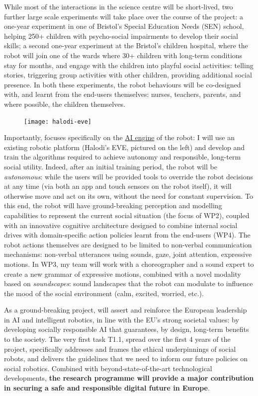 While most of the interactions in the science centre will be short-lived, two further
large scale experiments will take place over the course of the project: a
one-year experiment in one of Bristol's Special Education Needs (SEN) school,
helping 250+ children with psycho-social impairments to develop their social
skills; a second one-year experiment at the Bristol's children hospital, where
the robot will join one of the wards where 30+ children with long-term conditions
stay for months, and engage with the children into playful social activities: telling
stories, triggering group activities with other children, providing additional
social presence. In both these experiments, the robot behaviours will be
co-designed with, and learnt from the end-users themselves: nurses, teachers,
parents, and where possible, the children themselves.


\begin{figure}
    \centering
    \vspace{-10pt}
    \texttt{[image: halodi-eve]}
    \label{fig|EVE}
\end{figure}

Importantly, \project focuses specifically on the \ul{AI engine} of the robot: I
will use an existing robotic platform (Halodi's EVE, pictured on the left) and
develop and train the algorithms required to achieve autonomy and responsible,
long-term social utility. Indeed, after an initial training period, the robot
will be \emph{autonomous}: while the users will be provided tools to override
the robot decisions at any time (via both an app and touch sensors on the robot
itself), it will otherwise move and act on its own, without the need for
constant supervision. To this end, the robot will have ground-breaking
perception and modelling capabilities to represent the current social situation
(the focus of WP2), coupled with an innovative cognitive architecture designed
to combine internal social drives with domain-specific action policies learnt
from the end-users (WP4). The robot actions themselves are designed to be
limited to non-verbal communication mechanisms: non-verbal utterances using
sounds, gaze, joint attention, expressive motions. In WP3, my team will work
with a choreographer and a sound expert to create a new grammar of expressive
motions, combined with a novel modality based on \emph{soundscapes}: sound
landscapes that the robot can modulate to influence the mood of the social
environment (calm, excited, worried, etc.).

As a ground-breaking project, \project will assert and reinforce the European
leadership in AI and intelligent robotics, in line with the EU's strong societal
values: by developing socially responsible AI that guarantees, by design,
long-term benefits to the society. The very first task T1.1, spread over the
first 4 years of the project, specifically addresses and frames the ethical
underpinnings of social robots, and delivers the guidelines that we need to
inform our future policies on social robotics. Combined with
beyond-state-of-the-art technological developments, \textbf{the \project
research programme will provide a major contribution in securing a safe and
responsible digital future in Europe}. 

